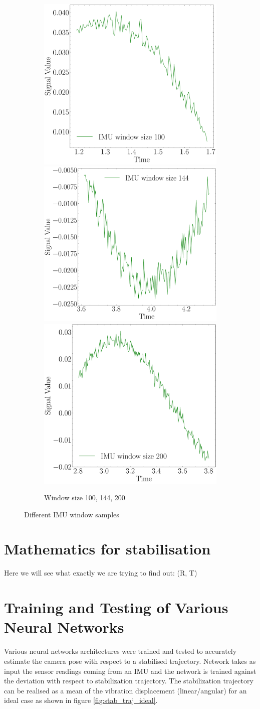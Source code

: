 \begin{figure}
    \begin{subfigure}{\linewidth}
    \includegraphics[width=.3\linewidth]{images/fig_chapter4/imu_windows/imu_window_size_100.pdf}\hfill
    \includegraphics[width=.3\linewidth]{images/fig_chapter4/imu_windows/imu_window_size_144.pdf}\hfill
    \includegraphics[width=.3\linewidth]{images/fig_chapter4/imu_windows/imu_window_size_200.pdf}\hfill
    \caption{Window size 100, 144, 200}
    \end{subfigure}
\caption{Different IMU window samples}
\label{fig:imu_window_samples}
\end{figure}


\section{Mathematics for stabilisation}
Here we will see what exactly we are trying to find out: (R, T)

\section{Training and Testing of Various Neural Networks}
Various neural networks architectures were trained and tested to accurately estimate the camera pose with respect to a stabilised trajectory. Network takes as input the sensor readings coming from an IMU and the network is trained against the deviation with respect to stabilization trajectory. The stabilization trajectory can be realised as a mean of the vibration displacement (linear/angular) for an ideal case as shown in figure \ref{fig:stab_traj_ideal}. 

